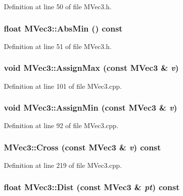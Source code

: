 Definition at line 50 of file MVec3.h.\hypertarget{class_m_vec3_6bab49220a80edba7d84375688519850}{
\subsubsection[{AbsMin}]{\setlength{\rightskip}{0pt plus 5cm}float MVec3::AbsMin () const}}
\label{class_m_vec3_6bab49220a80edba7d84375688519850}




Definition at line 51 of file MVec3.h.\hypertarget{class_m_vec3_a2bca5724dbee66428e3cce3d1c75070}{
\subsubsection[{AssignMax}]{\setlength{\rightskip}{0pt plus 5cm}void MVec3::AssignMax (const {\bf MVec3} \& {\em v})}}
\label{class_m_vec3_a2bca5724dbee66428e3cce3d1c75070}




Definition at line 101 of file MVec3.cpp.\hypertarget{class_m_vec3_4b4aa3eef6d824a331b36b7f559b29ac}{
\subsubsection[{AssignMin}]{\setlength{\rightskip}{0pt plus 5cm}void MVec3::AssignMin (const {\bf MVec3} \& {\em v})}}
\label{class_m_vec3_4b4aa3eef6d824a331b36b7f559b29ac}




Definition at line 92 of file MVec3.cpp.\hypertarget{class_m_vec3_dcd74e76cefbb1b650c5dece5f115aae}{
\subsubsection[{Cross}]{ MVec3::Cross (const {\bf MVec3} \& {\em v}) const}}
\label{class_m_vec3_dcd74e76cefbb1b650c5dece5f115aae}




Definition at line 219 of file MVec3.cpp.\hypertarget{class_m_vec3_55337896656651e4e3a8214c718e5043}{
\subsubsection[{Dist}]{\setlength{\rightskip}{0pt plus 5cm}float MVec3::Dist (const {\bf MVec3} \& {\em pt}) const}}
\label{class_m_vec3_55337896656651e4e3a8214c718e5043}





